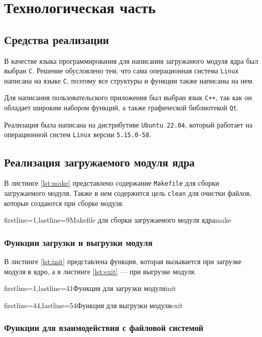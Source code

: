 \chapter{Технологическая часть}

\section{Средства реализации}

В качестве языка программирования для написания загружамого модуля ядра был выбран \texttt{C}. Решение обусловлено тем, что сама операционная система \texttt{Linux} написана на языке \texttt{C}, поэтому все структуры и функции также написаны на нем.

Для написания пользовательского приложения был выбран язык \texttt{C++}, так как он обладает широким набором функций, а также графической библиотекой \texttt{Qt}.

Реализация была написана на дистрибутиве \texttt{Ubuntu 22.04}, который работает на операционной систем \texttt{Linux} версии \texttt{5.15.0-58}.


\section{Реализация загружаемого модуля ядра}

В листинге \ref{lst:make} представлено содержание \texttt{Makefile} для сборки загружаемого модуля. Также в нем содержится цель \texttt{clean} для очистки файлов, которые создаются при сборке модуля.

        {firstline=1,lastline=9}{Makefile для сборки загружаемого модуля ядра}{make}{}

\subsection{Функции загрузки и выгрузки модуля}

В листинге \ref{lst:init} представлена функция, которая вызывается при загрузке модуля в ядро, а в листинге \ref{lst:exit} --- при выгрузке модуля.

    {firstline=1,lastline=41}{Функция для загрузки модуля}{init}{}
        
    {firstline=44,lastline=54}{Функция для выгрузки модуля}{exit}{}


\subsection{Функции для взаимодействия с файловой системой}

